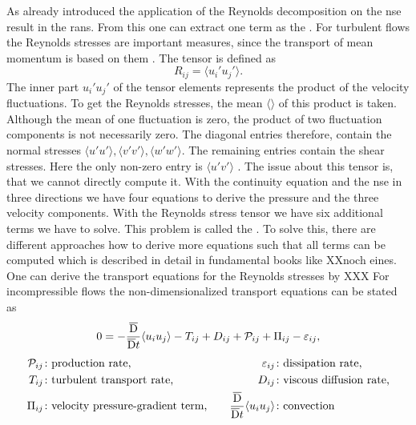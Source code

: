 As already introduced the application of the Reynolds decomposition on the \acrshort{nse} result in the \acrshort{rans}.
From this one can extract one term as the .
For turbulent flows the Reynolds stresses are important measures, since the transport of mean momentum is based on them \citep{moin_fundamentals_2024}. 
The tensor is defined as 
\begin{equation}
    R_{ij} =  \langle u_i' u_j'\rangle.
\end{equation}
The inner part $u_i' u_j'$ of the tensor elements represents the product of the velocity fluctuations.
To get the Reynolds stresses, the mean $\langle \rangle$ of this product is taken.
Although the mean of one fluctuation is zero, the product of two fluctuation components is not necessarily zero. 
The diagonal entries therefore, contain the normal stresses $\langle u' u'\rangle, \langle v' v'\rangle, \langle w' w'\rangle$.
The remaining entries contain the shear stresses.
Here the only non-zero entry is $\langle u' v'\rangle$ \citep{schlichting_boundary-layer_2017}.
The issue about this tensor is, that we cannot directly compute it.
With the continuity equation and the \acrshort{nse} in three directions we have four equations to derive the pressure and the three velocity components.
With the Reynolds stress tensor we have six additional terms we have to solve.
This problem is called the  \citep{wilcox_turbulence_2006}.
To solve this, there are different approaches how to derive more equations such that all terms can be computed which is described in detail in fundamental books like \citet{wilcox_turbulence_2006,pope_turbulent_2015} XXnoch eines.
One can derive the transport equations for the Reynolds stresses by XXX \citep{mansour_reynolds-stress_1988}
For incompressible flows the non-dimensionalized transport equations can be stated as 
\begin{gather}
    0 = -\frac{\overline{\mathrm{D}}}{\overline{\mathrm{D}}t} \langle u_i u_j \rangle - T_{ij} + D_{ij} + \mathcal{P}_{ij} + \Pi_{ij} - \varepsilon_{ij}, \\[4pt]
    \begin{aligned}
        \mathcal{P}_{ij} &\colon \text{production rate,} & \quad \varepsilon_{ij} &\colon \text{dissipation rate,} \\
        T_{ij} &\colon \text{turbulent transport rate,} & \quad D_{ij} &\colon \text{viscous diffusion rate,} \\
        \Pi_{ij} &\colon \text{velocity pressure-gradient term,} & \quad \frac{\overline{\mathrm{D}}}{\overline{\mathrm{D}}t} \langle u_i u_j \rangle &\colon \text{convection}
    \end{aligned} \notag
\end{gather}
